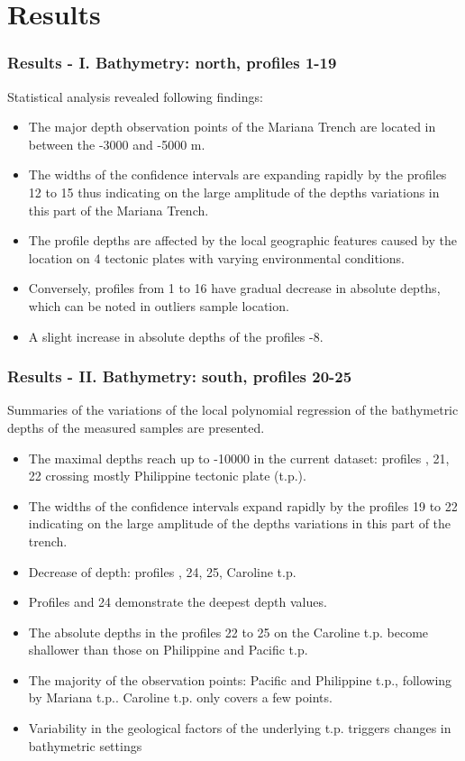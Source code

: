 \documentclass[pdflatex,compress,10pt,
	xcolor={dvipsnames,dvipsnames,svgnames,x11names,table},
	hyperref={colorlinks = true,breaklinks = true, urlcolor = NavyBlue, breaklinks = true}]{beamer}
\begin{document}
\section{Results}
\begin{frame}\frametitle{Results - I. Bathymetry: north, profiles 1-19}
Statistical analysis revealed following findings:
\begin{itemize}
    \item The major depth observation points of the Mariana Trench are located in between the -3000 and -5000 m.
    \item The widths of the confidence intervals are expanding rapidly by the profiles 12 to 15 thus indicating on the large amplitude of the depths variations in this part of the Mariana Trench.
    \item The profile depths are affected by the local geographic features caused by the location on 4 tectonic plates with varying environmental conditions.
    \item Conversely, profiles from 1 to 16 have gradual decrease in absolute depths, which can be noted in outliers sample location. 
    \item A slight increase in absolute depths of the profiles \textnumero {}-8. 
\end{itemize}
\end{frame}
	
\begin{frame}\frametitle{Results - II. Bathymetry: south, profiles 20-25}
Summaries of the variations of the local polynomial regression of the bathymetric depths of the measured samples are presented. \begin{itemize}
    \item The maximal depths reach up to -10000 in the current dataset: profiles , 21, 22 crossing mostly Philippine tectonic plate (t.p.).
    \item The widths of the confidence intervals expand rapidly by the profiles 19 to 22 indicating on the large amplitude of the depths variations in this part of the trench.
    \item Decrease of depth: profiles , 24, 25, Caroline t.p.
    \item Profiles  and 24 demonstrate the deepest depth values. 
    \item The absolute depths in the profiles 22 to 25 on the Caroline t.p. become shallower than those on Philippine and Pacific t.p.
    \item The majority of the observation points: Pacific and Philippine t.p., following by Mariana t.p.. Caroline t.p. only covers a few points. 
    \item Variability in the geological factors of the underlying t.p. triggers changes in bathymetric settings
\end{itemize}
\end{frame}	
\end{document}
